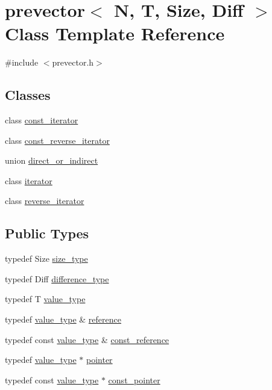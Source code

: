 \hypertarget{classprevector}{}\section{prevector$<$ N, T, Size, Diff $>$ Class Template Reference}
\label{classprevector}


{\ttfamily \#include $<$prevector.\+h$>$}

\subsection*{Classes}
\begin{DoxyCompactItemize}
\item 
class \mbox{\hyperlink{classprevector_1_1const__iterator}{const\+\_\+iterator}}
\item 
class \mbox{\hyperlink{classprevector_1_1const__reverse__iterator}{const\+\_\+reverse\+\_\+iterator}}
\item 
union \mbox{\hyperlink{unionprevector_1_1direct__or__indirect}{direct\+\_\+or\+\_\+indirect}}
\item 
class \mbox{\hyperlink{classprevector_1_1iterator}{iterator}}
\item 
class \mbox{\hyperlink{classprevector_1_1reverse__iterator}{reverse\+\_\+iterator}}
\end{DoxyCompactItemize}
\subsection*{Public Types}
\begin{DoxyCompactItemize}
\item 
typedef Size \mbox{\hyperlink{classprevector_a7e0da95e6d1c878f6eeb572f4fc12524}{size\+\_\+type}}
\item 
typedef Diff \mbox{\hyperlink{classprevector_a34ad7f610eefb33a8db9161cadf15dbe}{difference\+\_\+type}}
\item 
typedef T \mbox{\hyperlink{classprevector_aaab8519e15c3bdebdcc4bbc86fcff33c}{value\+\_\+type}}
\item 
typedef \mbox{\hyperlink{classprevector_aaab8519e15c3bdebdcc4bbc86fcff33c}{value\+\_\+type}} \& \mbox{\hyperlink{classprevector_a457464223499e5cad0ab1b8123d82109}{reference}}
\item 
typedef const \mbox{\hyperlink{classprevector_aaab8519e15c3bdebdcc4bbc86fcff33c}{value\+\_\+type}} \& \mbox{\hyperlink{classprevector_a381a4d3f4c3f74fde0c92ef21e755ef4}{const\+\_\+reference}}
\item 
typedef \mbox{\hyperlink{classprevector_aaab8519e15c3bdebdcc4bbc86fcff33c}{value\+\_\+type}} $\ast$ \mbox{\hyperlink{classprevector_ad9c63f0c4a27f8a3c1fc71e153cb93ad}{pointer}}
\item 
typedef const \mbox{\hyperlink{classprevector_aaab8519e15c3bdebdcc4bbc86fcff33c}{value\+\_\+type}} $\ast$ \mbox{\hyperlink{classprevector_ae322a41a56ba4c7aad96a2270b9f34fc}{const\+\_\+pointer}}
\end{DoxyCompactItemize}
